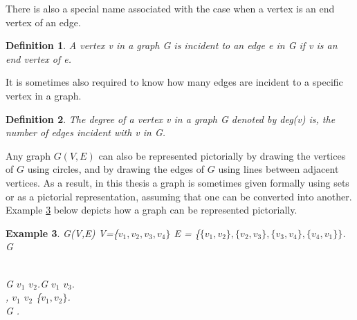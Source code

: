 \documentclass[12pt]{article}
\newtheorem{definition}{Definition}[subsection]
\newtheorem{example}[definition]{Example}
\numberwithin{equation}{subsection}
\numberwithin{table}{subsection}
\begin{document}
There is also a special name associated with the case when a vertex is an end vertex of an edge.
\begin{definition}
\label{incident}
A vertex v in a graph G is incident to an edge e in G if v is an end vertex of e. {}
\end{definition}
It is sometimes also required to know how many edges are incident to a specific vertex in a graph.
\begin{definition}
\label{degree}
The degree of a vertex v in a graph G denoted by deg(v) is, the number of edges incident with v in G. {}
\end{definition}
Any graph $\mathit{G(V,E)}$ can also be represented pictorially by drawing the vertices of $\mathit{G}$ using circles, and by drawing the edges of $\mathit{G}$ using lines between adjacent vertices. As a result, in this thesis a graph is sometimes given formally using sets or as a pictorial representation, assuming that one can be converted into another. Example \ref{Example 1} below depicts how a graph can be represented pictorially.
\begin{example}
\label{Example 1}
{} G(V,E) {}  V=\{$v_1, v_2, v_3, v_4\}$ {} E = \{$\{v_1, v_2\}, \{v_2,v_3\}, \{v_3,v_4\}, \{v_4,v_1\}\}$.\\{} G {}\\

\\
{}G {} $v_1$ {} $v_2$.{}G {} $v_1$ {} $v_3.$\\ {}, $v_1$ {} $v_2$ {} \{$v_1, v_2\}$.\\
{} G {}.
\end{example}
\end{document}
